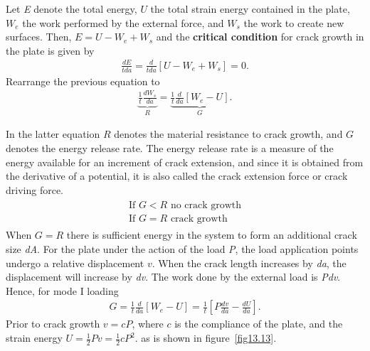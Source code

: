 \documentclass{AeroStructure-ERJohnson}
\begin{document}
\vspace*{-5pt}

\noindent Let \textit{E} denote the total energy, $U$ the total strain energy contained in the plate, $W_{e}$ the work performed by the external force, and $W_{s}$ the work to create new surfaces. Then, $E=U-W_{e}+W_{s}$ and the \textbf{critical condition} for crack growth in the plate is given by
\begin{align}\label{eq13.22}
\frac{d E}{t d a}=\frac{d}{t d a}\left[U-W_{e}+W_{s}\right]=0.
\end{align}
Rearrange the previous equation to
\begin{align}\label{eq13.23}
\underbrace{\frac{1}{t} \frac{d W_{s}}{d a}}_{R}=\underbrace{\frac{1}{t} \frac{d}{d a}\left[W_{e}-U\right]}_{G}.
\end{align}
\vspace*{2pt}
\pagebreak

\noindent In the latter equation $R$ denotes the material resistance to crack growth, and $G$ denotes the energy release rate. The energy release rate is a measure of the energy available for an increment of crack extension, and since it is obtained from the derivative of a potential, it is also called the crack extension force or crack driving force.
\begin{gather}
\boxed{
\begin{array}{ll}
\textrm{If $G<R$ no crack growth} \\
\textrm{If $G=R$ crack growth}
\end{array}} \label{eq13.24}
\end{gather}
When $G=R$ there is sufficient energy in the system to form an additional crack size \textit{dA}. For the plate under the action of the load \textit{P}, the load application points undergo a relative displacement $v$. When the crack length increases by \textit{da}, the displacement will increase by \textit{dv}. The work done by the external load is \textit{Pdv}. Hence, for mode I loading
\begin{align}\label{eq13.25}
G=\frac{1}{t} \frac{d}{d a}\left[W_{e}-U\right]=\frac{1}{t}\left[P \frac{d v}{d a}-\frac{d U}{d a}\right].
\end{align}
Prior to crack growth $v=c P$, where $c$ is the compliance of the plate, and the strain energy $U=\frac{1}{2} P v=\frac{1}{2} c P^{2}$. as is shown in figure~\ref{fig13.13}.

\end{document}
